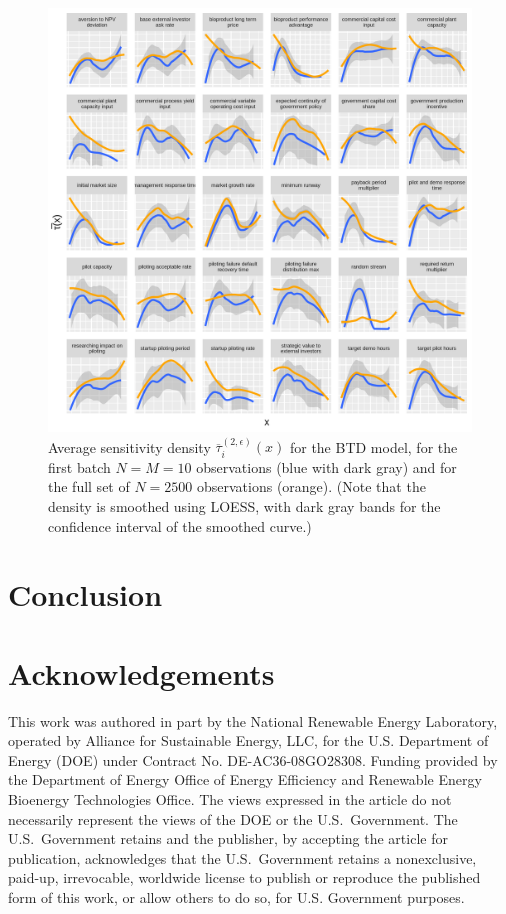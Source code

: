 \documentclass[12pt]{article}
\begin{document}
\begin{figure}
    \centering
    \includegraphics[width=\linewidth]{figures/btd-taubar1.png}
    \caption{Average sensitivity density $\overline{\tau}_i^{(2,\epsilon)}(x)$ for the BTD model, for the first batch $N = M = 10$ observations (blue with dark gray) and for the full set of $N = 2500$ observations (orange). (Note that the density is smoothed using LOESS, with dark gray bands for the confidence interval of the smoothed curve.)}
    \label{fig:btd-taubar1}
\end{figure}


\section{Conclusion}



\section*{Acknowledgements}

This work was authored in part by the National Renewable Energy Laboratory, operated by Alliance for Sustainable Energy, LLC, for the U.S. Department of Energy (DOE) under Contract No. DE-AC36-08GO28308. Funding provided by the Department of Energy Office of Energy Efficiency and Renewable Energy Bioenergy Technologies Office. The views expressed in the article do not necessarily represent the views of the DOE or the U.S.\ Government. The U.S.\ Government retains and the publisher, by accepting the article for publication, acknowledges that the U.S.\ Government retains a nonexclusive, paid-up, irrevocable, worldwide license to publish or reproduce the published form of this work, or allow others to do so, for U.S. Government purposes.
\end{document}
